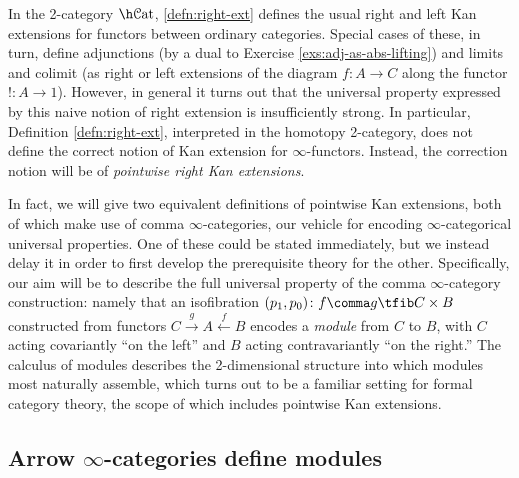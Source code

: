 \documentclass[12pt,reqno]{amsart}
\theoremstyle{plain}
\theoremstyle{definition}
\theoremstyle{remark}
\numberwithin{equation}{subsection}
\renewcommand{\Cat}{\mathcal{C}\mathrm{at}}
\begin{document}
In the 2-category $\h\Cat$, \ref{defn:right-ext} defines the usual right and left Kan extensions for functors between ordinary categories. Special cases of these, in turn, define adjunctions (by a dual to Exercise \ref{exs:adj-as-abs-lifting}) and limits and colimit (as right or left extensions of the diagram $f \colon A \to C$ along the functor $!\colon A \to 1$). However, in general it turns out that the universal property expressed by this naive notion of right extension is insufficiently strong. In particular, Definition \ref{defn:right-ext}, interpreted in the homotopy 2-category, does not define the correct notion of Kan extension for $\infty$-functors. Instead, the correction notion will be of \emph{pointwise right Kan extensions}.

In fact, we will give two equivalent definitions of pointwise Kan extensions, both of which make use of comma $\infty$-categories, our vehicle for encoding $\infty$-categorical universal properties. One of these could be stated immediately, but we instead delay it in order to first develop the prerequisite theory for the other. Specifically, our aim will be to describe the full universal property of the comma $\infty$-category construction: namely that an isofibration $(p_1,p_0) \colon f \comma g \tfib C \times B$ constructed from functors $C \xrightarrow{g} A \xleftarrow{f} B$ encodes a \emph{module} from $C$ to $B$, with $C$ acting covariantly ``on the left'' and $B$ acting contravariantly ``on the right.'' The calculus of modules describes the 2-dimensional structure into which modules most naturally assemble, which turns out to be a familiar setting for formal category theory, the scope of which includes pointwise Kan extensions.

\subsection{Arrow \texorpdfstring{$\infty$}{infinity}-categories define modules}
\end{document}
